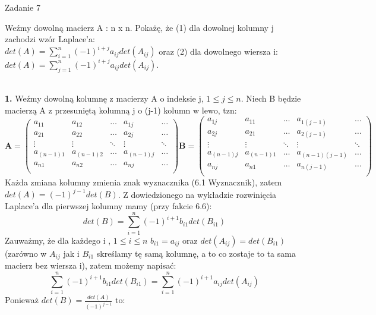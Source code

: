 \documentclass[a4paper]{article}
\begin{document}
\begin{center}
{\fontsize{20}{20}\selectfont Zadanie 7}
\end{center}

Weźmy dowolną macierz A : n x n. Pokażę, że (1) dla dowolnej kolumny j zachodzi wzór Laplace'a:\\
$ det(A) = \sum_{i=1}^{n}(-1)^{i + j}a_{ij}det(A_{ij}) $ oraz (2) dla dowolnego wiersza i: $ det(A) = \sum_{j=1}^{n}(-1)^{i + j}a_{ij}det(A_{ij}) $. \\ \\
\begin{adjustwidth}{30pt}{30pt}
\textbf{1.} Weźmy dowolną kolumnę z macierzy A o indeksie j, $ 1 \le j \le n $. Niech B będzie macierzą A z przesuniętą kolumną j o (j-1) kolumn w lewo, tzn: 
$$ \mathbf{A} = 
\left( \begin{array}{ccccc}
a_{11} & a_{12} & \ldots & a_{1j} & \ldots\\
a_{21} & a_{22} & \ldots & a_{2j} & \ldots \\
\vdots & \vdots & \ddots & \vdots & \ddots \\
a_{(n-1)1} & a_{(n-1)2} & \ldots & a_{(n-1)j} & \ldots \\
a_{n1} & a_{n2} & \ldots & a_{nj} & \ldots\\
\end{array} \right)
\mathbf{B} = 
\left( \begin{array}{ccccc}
a_{1j} & a_{11} & \ldots & a_{1(j-1)} & \ldots\\
a_{2j} & a_{21} & \ldots & a_{2(j-1)} & \ldots \\
\vdots & \vdots & \ddots & \vdots & \ddots \\
a_{(n-1)j} & a_{(n-1)1} & \ldots & a_{(n-1)(j-1)} & \ldots \\
a_{nj} & a_{n1} & \ldots & a_{n(j-1)} & \ldots\\
\end{array} \right) $$
Każda zmiana kolumny zmienia znak wyznacznika (6.1 Wyznacznik), zatem $ det(A) = (-1)^{j-1}det(B) $. Z dowiedzionego na wykładzie rozwinięcia Laplace'a dla pierwszej kolumny mamy (przy fakcie 6.6):
$$ det(B) = \sum_{i=1}^{n}(-1)^{i + 1}b_{i1}det(B_{i1}) $$ 
Zauważmy, że dla każdego i , $ 1 \le i \le n$ $b_{i1} = a_{ij}$ oraz $ det(A_{ij}) = det(B_{i1})$ (zarówno w $A_{ij}$ jak i $B_{i1}$ skreślamy tę samą kolumnę, a to co zostaje to ta sama macierz bez wiersza i), zatem możemy napisać:
$$\sum_{i=1}^{n}(-1)^{i + 1}b_{i1}det(B_{i1}) = \sum_{i=1}^{n}(-1)^{i + 1}a_{ij}det(A_{ij})$$
Ponieważ $det(B) = \frac{det(A)}{(-1)^{j-1}} $ to:

\end{adjustwidth}
\end{document}
